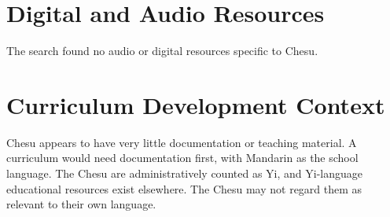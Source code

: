 \documentclass[12pt]{article}
\begin{document}
\section{Digital and Audio Resources}
The search found no audio or digital resources specific to Chesu.

\section{Curriculum Development Context}
Chesu appears to have very little documentation or teaching material. A curriculum would need documentation first, with Mandarin as the school language. The Chesu are administratively counted as Yi, and Yi-language educational resources exist elsewhere. The Chesu may not regard them as relevant to their own language.
\end{document}
